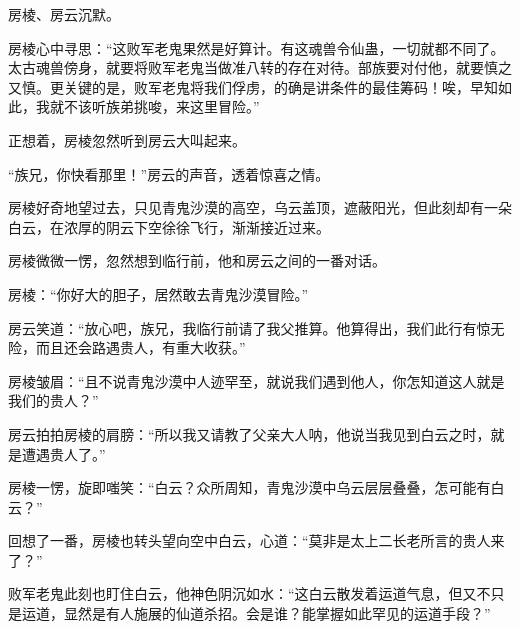 \begin{this_body}
房棱、房云沉默。

房棱心中寻思：“这败军老鬼果然是好算计。有这魂兽令仙蛊，一切就都不同了。太古魂兽傍身，就要将败军老鬼当做准八转的存在对待。部族要对付他，就要慎之又慎。更关键的是，败军老鬼将我们俘虏，的确是讲条件的最佳筹码！唉，早知如此，我就不该听族弟挑唆，来这里冒险。”

正想着，房棱忽然听到房云大叫起来。

“族兄，你快看那里！”房云的声音，透着惊喜之情。

房棱好奇地望过去，只见青鬼沙漠的高空，乌云盖顶，遮蔽阳光，但此刻却有一朵白云，在浓厚的阴云下空徐徐飞行，渐渐接近过来。

房棱微微一愣，忽然想到临行前，他和房云之间的一番对话。

房棱：“你好大的胆子，居然敢去青鬼沙漠冒险。”

房云笑道：“放心吧，族兄，我临行前请了我父推算。他算得出，我们此行有惊无险，而且还会路遇贵人，有重大收获。”

房棱皱眉：“且不说青鬼沙漠中人迹罕至，就说我们遇到他人，你怎知道这人就是我们的贵人？”

房云拍拍房棱的肩膀：“所以我又请教了父亲大人呐，他说当我见到白云之时，就是遭遇贵人了。”

房棱一愣，旋即嗤笑：“白云？众所周知，青鬼沙漠中乌云层层叠叠，怎可能有白云？”

回想了一番，房棱也转头望向空中白云，心道：“莫非是太上二长老所言的贵人来了？”

败军老鬼此刻也盯住白云，他神色阴沉如水：“这白云散发着运道气息，但又不只是运道，显然是有人施展的仙道杀招。会是谁？能掌握如此罕见的运道手段？”

\end{this_body}

